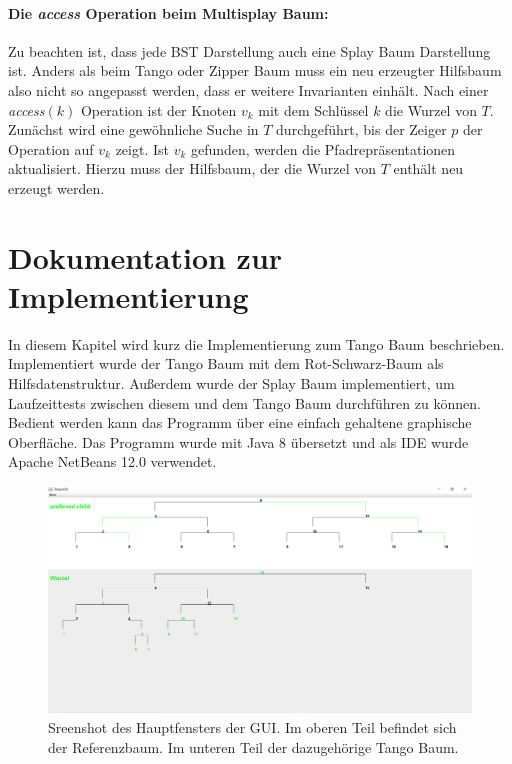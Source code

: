\documentclass[a4paper,12pt]{article}
\begin{document}
\paragraph{Die \textit{access} Operation beim Multisplay Baum:}
Zu beachten ist, dass jede BST Darstellung auch eine Splay Baum Darstellung ist. Anders als beim Tango oder Zipper Baum muss ein neu erzeugter Hilfsbaum also nicht so angepasst werden, dass er weitere Invarianten einhält.  Nach einer \textit{access}$\left(k\right)$ Operation ist der Knoten $v_k$ mit dem Schlüssel $k$ die Wurzel von $T$. Zunächst wird eine gewöhnliche Suche in $T$ durchgeführt, bis der Zeiger $p$ der Operation auf $v_k$ zeigt. Ist $v_k$ gefunden, werden die Pfadrepräsentationen aktualisiert. Hierzu muss der Hilfsbaum, der die Wurzel von $T$ enthält neu erzeugt werden. \\

\section{Dokumentation zur Implementierung}
In diesem Kapitel wird kurz die Implementierung zum Tango Baum beschrieben. 
Implementiert wurde der Tango Baum mit dem Rot-Schwarz-Baum als Hilfsdatenstruktur. Außerdem wurde der Splay Baum implementiert, um Laufzeittests zwischen diesem und dem Tango Baum durchführen zu können. Bedient werden kann das Programm über eine einfach gehaltene graphische Oberfläche. Das Programm wurde mit Java 8 übersetzt und als IDE wurde Apache NetBeans 12.0 verwendet. 
\begin{figure}[H]
	\centering
	\includegraphics[width= 1\textwidth]{"Medien/laufzeittest/MainGUI"}
	\caption{Sreenshot des Hauptfensters der GUI. Im oberen Teil befindet sich der Referenzbaum. Im unteren Teil der dazugehörige Tango Baum.}
	\label{fig:TangoBaumGui}
\end{figure}
\end{document}
